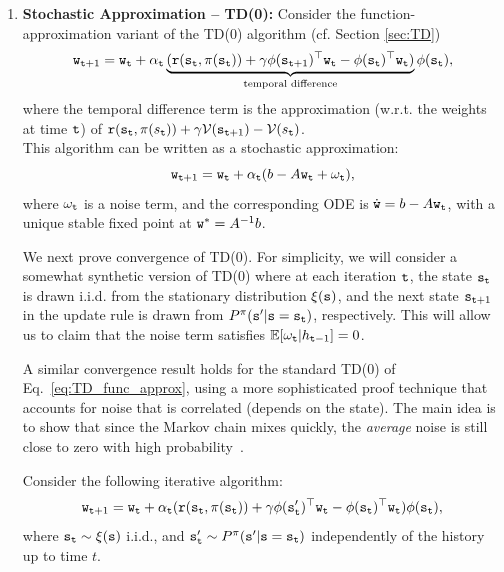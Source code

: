 \begin{enumerate}
\item \textbf{Stochastic Approximation -- TD(0):} Consider the function-approximation variant of the TD(0) algorithm (cf. Section \ref{sec:TD})
\begin{equation}\label{eq:TD_func_approx}
    {\tt w}_{{\tt t}+1} = {\tt w}_{\tt t} + \alpha_{\tt t} \underbrace{( {\tt r}({\tt s}_{\tt t},\pi({\tt s}_{\tt t})) +\gamma {\phi}({\tt s}_{{\tt t}+1})^\top {\tt w}_{\tt t} - {\phi}({\tt s}_{{\tt t}})^\top {\tt w}_{\tt t})}_{\textrm{temporal difference}} \phi({\tt s}_{{\tt t}}),
\end{equation}
where the temporal difference term is the approximation (w.r.t. the weights at time ${\tt t}$) of ${\tt r}({\tt s}_{\tt t},\pi(s_{\tt t})) +\gamma \mathcal{V}({\tt s}_{{\tt t}+1}) - \mathcal{V}(s_{\tt t})$.
\\
This algorithm can be written as a stochastic approximation:
\begin{equation*}
    {\tt w}_{{\tt t}+1} = {\tt w}_{\tt t} + \alpha_{\tt t} ( b -  A {\tt w}_{\tt t} + \omega_{\tt t} ),
\end{equation*}
where $\omega_{\tt t}$ is a noise term, and the corresponding ODE is $\dot{{\tt w}} = b -  A {\tt w}_{\tt t}$, with a unique stable fixed point at ${\tt w}^* = A^{-1}b$. 

We next prove convergence of TD(0). For simplicity, we will consider a somewhat synthetic version of TD(0) where at each iteration ${\tt t}$, the state ${\tt s}_{\tt t}$ is drawn i.i.d. from the stationary distribution $\xi({\tt s})$, and the next state ${\tt s}_{{\tt t}+1}$ in the update rule is drawn from $P^\pi({\tt s}'|{\tt s} = {\tt s}_{\tt t})$, respectively. This will allow us to claim that the noise term satisfies $\mathbb{E}[\omega_{\tt t}|h_{{\tt t}-1}]=0$. 

\begin{remark}
A similar convergence result holds for the standard TD(0) of Eq.~\ref{eq:TD_func_approx}, using a more sophisticated proof technique that accounts for noise that is correlated (depends on the state). The main idea is to show that since the Markov chain mixes quickly, the \textit{average} noise is still close to zero with high probability~\cite{TsitsiklisVR97}.
\end{remark}

\begin{theorem}
    Consider the following iterative algorithm:
    \begin{equation*}\label{eq:TD_func_approx_iid}
    {\tt w}_{{\tt t}+1} = {\tt w}_{\tt t} + \alpha_{\tt t} ( {\tt r}({\tt s}_{\tt t},\pi({\tt s}_{\tt t})) +\gamma {\phi}({\tt s}_{{\tt t}}')^\top {\tt w}_{\tt t} - {\phi}({\tt s}_{{\tt t}})^\top {\tt w}_{\tt t}) \phi({\tt s}_{{\tt t}}),
\end{equation*}
where ${\tt s}_{\tt t}\sim \xi({\tt s})$ i.i.d., and ${\tt s}_{{\tt t}}' \sim P^\pi({\tt s}'|{\tt s} = {\tt s}_{\tt t})$ independently of the history up to time $t$.
\end{theorem}

\end{enumerate}
